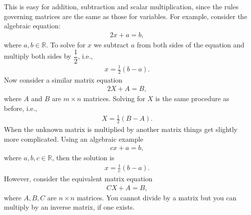 \documentclass[letterpaper,10pt,english]{jupyterBook}
\begin{document}
\sphinxAtStartPar
This is easy for addition, subtraction and scalar multiplication, since the rules governing matrices are the same as those for variables. For example, consider the algebraic equation:
\begin{equation*}
\begin{split} 2x + a = b, \end{split}
\end{equation*}
\sphinxAtStartPar
where \(a, b \in \mathbb{R}\). To solve for \(x\) we subtract \(a\) from both sides of the equation and multiply both sides by \(\dfrac{1}{2}\), i.e.,
\begin{equation*}
\begin{split} x = \frac{1}{2}(b - a). \end{split}
\end{equation*}
\sphinxAtStartPar
Now consider a similar matrix equation
\begin{equation*}
\begin{split} 2 X + A = B, \end{split}
\end{equation*}
\sphinxAtStartPar
where \(A\) and \(B\) are \(m \times n\) matrices. Solving for \(X\) is the same procedure as before, i.e.,
\begin{equation*}
\begin{split} X = \frac{1}{2}(B - A). \end{split}
\end{equation*}
\sphinxAtStartPar
When the unknown matrix is multiplied by another matrix things get slightly more complicated. Using an algebraic example
\begin{equation*}
\begin{split} c x + a = b, \end{split}
\end{equation*}
\sphinxAtStartPar
where \(a,b,c \in \mathbb{R}\), then the solution is
\begin{equation*}
\begin{split} x = \frac{1}{c}(b - a). \end{split}
\end{equation*}
\sphinxAtStartPar
However, consider the equivalent matrix equation
\begin{equation*}
\begin{split} C X + A = B, \end{split}
\end{equation*}
\sphinxAtStartPar
where \(A, B, C\) are \(n \times n\) matrices. You cannot divide by a matrix \sphinxhyphen{} but you can multiply by an inverse matrix, if one exists.
\end{document}
